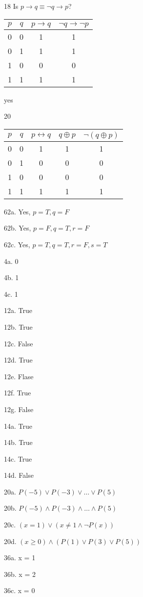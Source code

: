 \documentclass{article}
\begin{document}
18
Is $p \rightarrow q \equiv \lnot q \rightarrow p$?

\begin{tabular}{c|c|c|c}
$p$ &
$q$ &
$p \rightarrow q$ &
$\lnot q \rightarrow \lnot p$ \\
\hline
0 & 0 & 1 & 1 \\
0 & 1 & 1 & 1 \\
1 & 0 & 0 & 0 \\
1 & 1 & 1 & 1 \\
\end{tabular}
yes

20

\begin{tabular}{c|c|c|c|c}
$p$ &
$q$ &
$p \leftrightarrow q$ &
$q \oplus p$ &
$\lnot(q \oplus p)$ \\
\hline
0 & 0 & 1 & 1 & 1 \\
0 & 1 & 0 & 0 & 0 \\
1 & 0 & 0 & 0 & 0 \\
1 & 1 & 1 & 1 & 1 \\
\end{tabular}

62a. Yes, $p = T, q = F$

62b. Yes, $p = F, q = T, r = F$

62c. Yes, $p = T, q = T, r = F, s = T$

4a. 0

4b. 1

4c. 1

12a. True

12b. True

12c. False

12d. True

12e. Flase

12f. True

12g. False

14a. True

14b. True

14c. True

14d. False

20a. $P(-5) \lor P(-3) \lor \dots \lor P(5)$

20b. $P(-5) \land P(-3) \land \dots \land P(5)$

20c. $(x = 1) \lor (x \neq 1 \land \lnot P(x))$

20d. $(x \geq 0) \land (P(1) \lor P(3) \lor P(5))$

36a. x = 1

36b. x = 2

36c. x = 0
\end{document}
